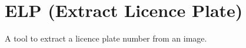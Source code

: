 \chapter{ELP (Extract Licence Plate)}
\hypertarget{md_README}{}\label{md_README}
\label{md_README_autotoc_md0}%
%


A tool to extract a licence plate number from an image. 